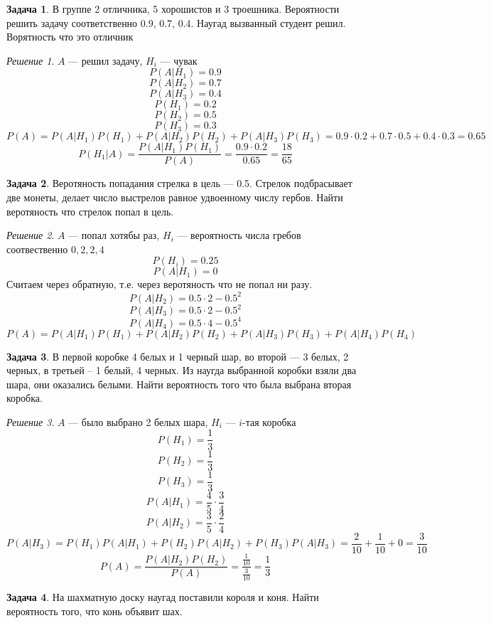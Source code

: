 \documentclass[english]{article}
\theoremstyle{plain}
\theoremstyle{remark}
\newtheorem*{solution}{Решение}
\theoremstyle{definition}
\newtheorem{task}{Задача}
\begin{document}
\begin{task}
В группе 2 отличника, 5 хорошистов и 3 троешника. Вероятности решить
задачу соответственно 0.9, 0.7, 0.4. Наугад вызванный студент
решил. Ворятность что это отличник
\end{task}
\begin{solution}
\(A\) --- решил задачу, \(H_i\) --- чувак
\[ P(A|H_1) = 0.9 \]
\[ P(A|H_2) = 0.7 \]
\[ P(A|H_3) = 0.4 \]
\[ P(H_1) = 0.2 \]
\[ P(H_2) = 0.5 \]
\[ P(H_3) = 0.3 \]
\[ P(A) = P(A|H_1)P(H_1) + P(A|H_2)P(H_2) + P(A|H_3)P(H_3) = 0.9\cdot0.2 + 0.7\cdot0.5 + 0.4\cdot0.3 = 0.65\]
\[ P(H_1|A) = \frac{P(A|H_1)P(H_1)}{P(A)} = \frac{0.9\cdot0.2}{0.65} = \frac{18}{65} \]
\end{solution}
\begin{task}
Веротяность попадания стрелка в цель --- 0.5. Стрелок подбрасывает две
монеты, делает число выстрелов равное удвоенному числу гербов. Найти
веротяность что стрелок попал в цель.
\end{task}
\begin{solution}
\(A\) --- попал хотябы раз, \(H_i\) --- вероятность числа гребов соотвественно \(0, 2, 2, 4\)
\[ P(H_i) = 0.25 \]
\[ P(A|H_1) = 0 \]
Считаем через обратную, т.е. через веротяность что не попал ни разу.
\[ P(A|H_2) = 0.5\cdot2 - 0.5^2 \]
\[ P(A|H_3) = 0.5\cdot2 - 0.5^2 \]
\[ P(A|H_4) = 0.5\cdot4 - 0.5^4 \]
\[ P(A) = P(A|H_1)P(H_1) + P(A|H_2)P(H_2) + P(A|H_3)P(H_3) + P(A|H_4)P(H_4) \]
\end{solution}
\begin{task}
В первой коробке 4 белых и 1 черный шар, во второй --- 3 белых, 2
черных, в третьей -- 1 белый, 4 черных. Из наугда выбранной коробки
взяли два шара, они оказались белыми. Найти вероятность того что была выбрана вторая коробка.
\end{task}
\begin{solution}
\(A\) --- было выбрано 2 белых шара, \(H_i\) --- \(i\text{-тая}\) коробка
\[ P(H_1) = \frac{1}{3} \]
\[ P(H_2) = \frac{1}{3} \]
\[ P(H_3) = \frac{1}{3} \]
\[ P(A|H_1) = \frac{4}{5}\cdot\frac{3}{4} \]
\[ P(A|H_2) = \frac{3}{5}\cdot\frac{2}{4} \]
\[ P(A|H_3) = P(H_1)P(A|H_1) + P(H_2)P(A|H_2) + P(H_3)P(A|H_3) = \frac{2}{10} + \frac{1}{10} + 0 = \frac{3}{10} \]
\[ P(A) = \frac{P(A|H_2)P(H_2)}{P(A)} = \frac{\frac{1}{10}}{\frac{3}{10}} = \frac{1}{3} \]
\end{solution}
\begin{task}
На шахматную доску наугад поставили короля и коня. Найти вероятность того, что конь объявит шах.
\end{task}
\end{document}
